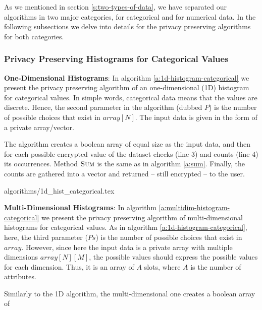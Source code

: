 As we mentioned in section \ref{s:two-types-of-data}, we have separated our algorithms in two major categories, for categorical and for numerical data.
In the following subsections we delve into details for the privacy preserving algorithms for both categories.





\subsubsection{Privacy Preserving Histograms for Categorical Values}\label{sss:histogram-categorical}
\textbf{One-Dimensional Histograms}: In algorithm \ref{a:1d-histogram-categorical} we present the privacy preserving algorithm of an one-dimensional (1D) histogram for categorical values.
In simple words, categorical data means that the values are discrete.
Hence, the second parameter in the algorithm (dubbed $P$) is the number of possible choices that exist in $array[N]$.
The input data is given in the form of a private array/vector.

The algorithm creates a boolean array of equal size as the input data, and then for each possible encrypted value of the dataset checks (line 3) and counts (line 4) its occurrences.
Method { $\textsc{Sum}$} is the same as in algorithm \ref{a:sum}.
Finally, the counts are gathered into a vector and returned -- still encrypted -- to the user.

{algorithms/1d_hist_categorical.tex}



\textbf{Multi-Dimensional Histograms}: In algorithm \ref{a:multidim-histogram-categorical} we present the privacy preserving algorithm of multi-dimensional histograms for categorical values.
As in algorithm \ref{a:1d-histogram-categorical}, here, the third parameter ($Ps$) is the number of possible choices that exist in $array$.
However, since here the input data is a private array with multiple dimensions $array[N][M]$, the possible values should express the possible values for each dimension.
Thus, it is an array of $A$ slots, where $A$ is the number of attributes.

Similarly to the 1D algorithm, the multi-dimensional one creates a boolean array of 

